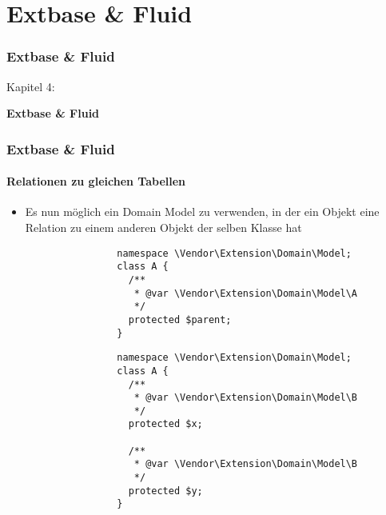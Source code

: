 %

\section{Extbase \& Fluid}
\begin{frame}[fragile]
	\frametitle{Extbase \& Fluid}

	\begin{center}\huge{Kapitel 4:}\end{center}
	\begin{center}\huge{\color{typo3darkgrey}\textbf{Extbase \& Fluid}}\end{center}

\end{frame}


\begin{frame}[fragile]
	\frametitle{Extbase \& Fluid}
	\framesubtitle{Relationen zu gleichen Tabellen}

	\lstset{basicstyle=\tiny\ttfamily}

	\begin{itemize}

		\item Es nun möglich ein Domain Model zu verwenden, in der ein Objekt eine
			Relation zu einem anderen Objekt der selben Klasse hat

			\begin{lstlisting}
				namespace \Vendor\Extension\Domain\Model;
				class A {
				  /**
				   * @var \Vendor\Extension\Domain\Model\A
				   */
				  protected $parent;
				}
			\end{lstlisting}

			\begin{lstlisting}
				namespace \Vendor\Extension\Domain\Model;
				class A {
				  /**
				   * @var \Vendor\Extension\Domain\Model\B
				   */
				  protected $x;

				  /**
				   * @var \Vendor\Extension\Domain\Model\B
				   */
				  protected $y;
				}
			\end{lstlisting}

	\end{itemize}

\end{frame}

